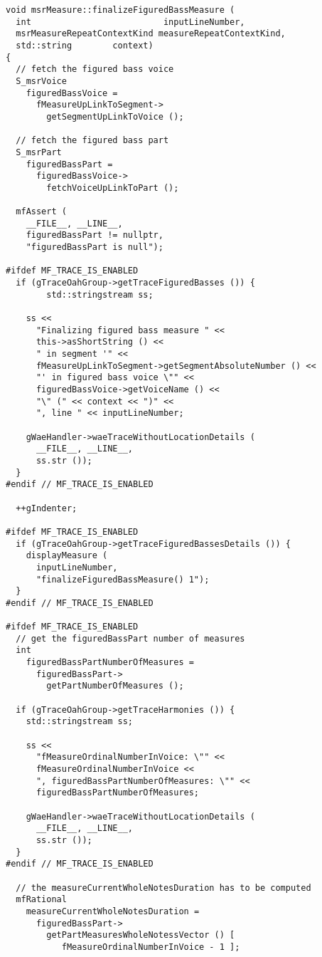 \begin{lstlisting}[language=CPlusPlus]
void msrMeasure::finalizeFiguredBassMeasure (
  int                          inputLineNumber,
  msrMeasureRepeatContextKind measureRepeatContextKind,
  std::string        context)
{
  // fetch the figured bass voice
  S_msrVoice
    figuredBassVoice =
      fMeasureUpLinkToSegment->
        getSegmentUpLinkToVoice ();

  // fetch the figured bass part
  S_msrPart
    figuredBassPart =
      figuredBassVoice->
        fetchVoiceUpLinkToPart ();

  mfAssert (
    __FILE__, __LINE__,
    figuredBassPart != nullptr,
    "figuredBassPart is null");

#ifdef MF_TRACE_IS_ENABLED
  if (gTraceOahGroup->getTraceFiguredBasses ()) {
		std::stringstream ss;

    ss <<
      "Finalizing figured bass measure " <<
      this->asShortString () <<
      " in segment '" <<
      fMeasureUpLinkToSegment->getSegmentAbsoluteNumber () <<
      "' in figured bass voice \"" <<
      figuredBassVoice->getVoiceName () <<
      "\" (" << context << ")" <<
      ", line " << inputLineNumber;

    gWaeHandler->waeTraceWithoutLocationDetails (
      __FILE__, __LINE__,
      ss.str ());
  }
#endif // MF_TRACE_IS_ENABLED

  ++gIndenter;

#ifdef MF_TRACE_IS_ENABLED
  if (gTraceOahGroup->getTraceFiguredBassesDetails ()) {
    displayMeasure (
      inputLineNumber,
      "finalizeFiguredBassMeasure() 1");
  }
#endif // MF_TRACE_IS_ENABLED

#ifdef MF_TRACE_IS_ENABLED
  // get the figuredBassPart number of measures
  int
    figuredBassPartNumberOfMeasures =
      figuredBassPart->
        getPartNumberOfMeasures ();

  if (gTraceOahGroup->getTraceHarmonies ()) {
    std::stringstream ss;

    ss <<
      "fMeasureOrdinalNumberInVoice: \"" <<
      fMeasureOrdinalNumberInVoice <<
      ", figuredBassPartNumberOfMeasures: \"" <<
      figuredBassPartNumberOfMeasures;

    gWaeHandler->waeTraceWithoutLocationDetails (
      __FILE__, __LINE__,
      ss.str ());
  }
#endif // MF_TRACE_IS_ENABLED

  // the measureCurrentWholeNotesDuration has to be computed
  mfRational
    measureCurrentWholeNotesDuration =
      figuredBassPart->
        getPartMeasuresWholeNotessVector () [
           fMeasureOrdinalNumberInVoice - 1 ];


\end{lstlisting}
